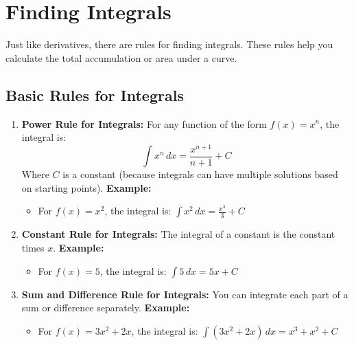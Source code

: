 \section{Finding Integrals}
Just like derivatives, there are rules for finding integrals. These rules help you calculate the total accumulation or area under a curve.

\subsection{Basic Rules for Integrals}
\begin{enumerate}
    \item \textbf{Power Rule for Integrals:} For any function of the form \( f(x) = x^n \), the integral is:
    \[
    \int x^n \, dx = \frac{x^{n+1}}{n+1} + C
    \]
    Where \( C \) is a constant (because integrals can have multiple solutions based on starting points).
    \textbf{Example:}
    \begin{itemize}
        \item For \( f(x) = x^2 \), the integral is: \( \int x^2 \, dx = \frac{x^3}{3} + C \)
    \end{itemize}
    \item \textbf{Constant Rule for Integrals:} The integral of a constant is the constant times \( x \).
    \textbf{Example:}
    \begin{itemize}
        \item For \( f(x) = 5 \), the integral is: \( \int 5 \, dx = 5x + C \)
    \end{itemize}
    \item \textbf{Sum and Difference Rule for Integrals:} You can integrate each part of a sum or difference separately.
    \textbf{Example:}
    \begin{itemize}
        \item For \( f(x) = 3x^2 + 2x \), the integral is: \( \int (3x^2 + 2x) \, dx = x^3 + x^2 + C \)
    \end{itemize}
\end{enumerate}

